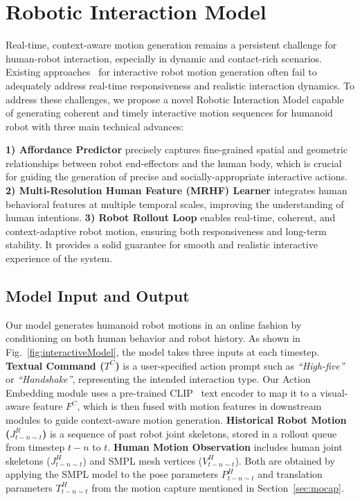 \section{Robotic Interaction Model}
\label{sec:interactivemodel}
% 

Real-time, context-aware motion generation remains a persistent challenge for human-robot interaction, especially in dynamic and contact-rich scenarios.
Existing approaches~\cite{wang2021multi,xu2024regennet,mueller2024massively} for interactive robot motion generation often fail to adequately address real-time responsiveness and realistic interaction dynamics. To address these challenges, we propose a novel Robotic Interaction Model capable of generating coherent and timely interactive motion sequences for humanoid robot with three main technical advances:

\noindent\textbf{1) Affordance Predictor} precisely captures fine-grained spatial and geometric relationships between robot end-effectors and the human body, which is crucial for guiding the generation of precise and socially-appropriate interactive actions.
\noindent \textbf{2) Multi-Resolution Human Feature (MRHF) Learner} integrates human behavioral features at multiple temporal scales, improving the understanding of human intentions.
\noindent \textbf{3) Robot Rollout Loop} enables real-time, coherent, and context-adaptive robot motion, ensuring both responsiveness and long-term stability. It provides a solid guarantee for smooth and realistic interactive experience of the system.


\subsection{Model Input and Output}
Our model generates humanoid robot motions in an online fashion by conditioning on both human behavior and robot history. As shown in Fig.~\ref{fig:interactiveModel}, the model takes three inputs at each timestep.
\noindent\textbf{Textual Command ($T^C$)} is a user-specified action prompt such as \textit{``High-five''} or \textit{``Handshake''}, representing the intended interaction type. Our Action Embedding module uses a pre-trained CLIP~\cite{radford2021learning} text encoder to map it to a visual-aware feature $F^C$, which is then fused with motion features in downstream modules to guide context-aware motion generation.
\noindent\textbf{Historical Robot Motion ($J^{R}_{t-n\sim t}$)} is a sequence of past robot joint skeletons, stored in a rollout queue from timestep $t - n$ to $t$. \noindent\textbf{Human Motion Observation} includes human joint skeletons ($J^{H}_{t-n\sim t}$) and SMPL mesh vertices ($V^{H}_{t-n\sim t}$). Both are obtained by applying the SMPL model to the pose parameters \( P^{H}_{t-n\sim t} \) and translation parameters \( T^{H}_{t-n\sim t} \) from the motion capture mentioned in Section~\ref{sec:mocap}. 


